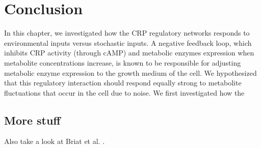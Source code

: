 







\section*{Conclusion}

In this chapter, 
we investigated how the CRP regulatory networks responds to environmental inputs versus stochastic inputs.
%
A negative feedback loop, which inhibits CRP activity (through cAMP) and metabolic enzymes expression when metabolite concentrations increase,
is known to be responsible for adjusting metabolic enzyme expression to the growth medium of the cell.
%
We hypothesized that this regulatory interaction should respond equally strong to metabolite fluctuations that occur in the cell due to noise. 
%
We first investigated how the 





\subsection*{More stuff}
Also take a look at Briat et al. \cite{Briat2016}.
